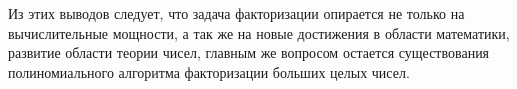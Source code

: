   Из этих выводов следует, что задача факторизации опирается не только на вычислительные мощности, а так же на новые достижения в области математики, развитие области теории чисел, главным же вопросом остается существования полиномиального алгоритма факторизации больших целых чисел.

  
  
 
